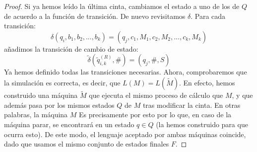 \begin{proof}
Si ya hemos leído la última cinta, cambiamos el estado a uno de los de $Q$ de acuerdo a la función de transición. De nuevo revisitamos $\delta$. Para cada transición:
$$
    \delta(q_i, b_1, b_2, ..., b_k) = (q_j, c_1, M_1, c_2, M_2, ..., c_k, M_k)
$$
añadimos la transición de cambio de estado:
\begin{equation}
    \widetilde{\delta}(\widetilde{q}_{i,k}^{(R)}, \#) = (q_j, \#, S)
\end{equation}
Ya hemos definido todas las transiciones necesarias. Ahora, comprobaremos que la simulación es correcta, es decir, que $L(M)=L(\widetilde{M})$. En efecto, hemos construido una máquina $\widetilde{M}$ que ejecuta el mismo proceso de cálculo que $M$, y que además pasa por los mismos estados $Q$ de $M$ tras modificar la cinta. En otras palabras, la máquina $M$  Es precisamente por esto por lo que, en caso de la máquina parar, se encontrará en un estado $q\in Q$ (la hemos construido para que ocurra esto). De este modo, el lenguaje aceptado por ambas máquinas coincide, dado que usamos el mismo conjunto de estados finales $F$.
\end{proof}

\pagebreak


